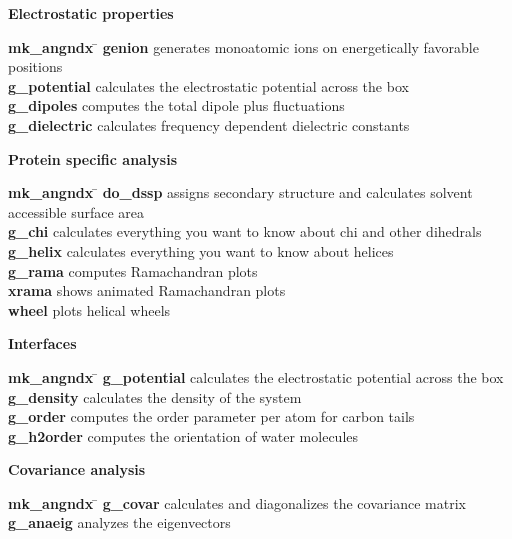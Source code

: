 \begin{description}
\item {\large\bf Electrostatic properties}
\begin{tabbing}
{\bf mk\_angndx} \= \kill
{\bf genion} \> generates monoatomic ions on energetically favorable positions \\
{\bf g\_potential} \> calculates the electrostatic potential across the box \\
{\bf g\_dipoles} \> computes the total dipole plus fluctuations \\
{\bf g\_dielectric} \> calculates frequency dependent dielectric constants \\
\end{tabbing}

\item {\large\bf Protein specific analysis}
\begin{tabbing}
{\bf mk\_angndx} \= \kill
{\bf do\_dssp} \> assigns secondary structure and calculates solvent accessible surface area \\
{\bf g\_chi} \> calculates everything you want to know about chi and other dihedrals \\
{\bf g\_helix} \> calculates everything you want to know about helices \\
{\bf g\_rama} \> computes Ramachandran plots \\
{\bf xrama} \> shows animated Ramachandran plots \\
{\bf wheel} \> plots helical wheels \\
\end{tabbing}

\item {\large\bf Interfaces}
\begin{tabbing}
{\bf mk\_angndx} \= \kill
{\bf g\_potential} \> calculates the electrostatic potential across the box \\
{\bf g\_density} \> calculates the density of the system \\
{\bf g\_order} \> computes the order parameter per atom for carbon tails \\
{\bf g\_h2order} \> computes the orientation of water molecules \\
\end{tabbing}

\item {\large\bf Covariance analysis}
\begin{tabbing}
{\bf mk\_angndx} \= \kill
{\bf g\_covar} \> calculates and diagonalizes the covariance matrix \\
{\bf g\_anaeig} \> analyzes the eigenvectors \\
\end{tabbing}


\end{description}

